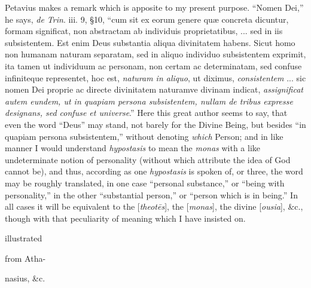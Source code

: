 Petavius makes a remark which is apposite
to my present purpose. ``Nomen Dei,'' he says, \emph{de Trin}.
iii. 9, §10, ``cum sit ex eorum genere quæ concreta dicuntur,
formam significat, non abstractam ab individuis proprietatibus,
... sed in iis subsistentem. Est enim Deus substantia aliqua
divinitatem habens. Sicut homo non humanam naturam separatam,
sed in aliquo individuo subsistentem exprimit, ita tamen ut
individuum ac personam, non certam ac determinatam, sed
confuse infiniteque representet, hoc est, \emph{naturam in aliquo},
ut diximus, \emph{consistentem} ... sic nomen Dei proprie ac
directe divinitatem naturamve divinam indicat, \emph{assignificat
autem eundem, ut in quapiam persona subsistentem, nullam de
tribus expresse designans, sed confuse et universe}.'' Here
this great author seems to say, that even the word ``Deus'' may
stand, not barely for the Divine Being, but besides ``in
quapiam persona subsistentem,'' without denoting \emph{which}
Person; and in like manner I would understand \emph{hypostasis}
to mean the \emph{monas} with a like undeterminate notion of
personality (without which attribute the idea of God cannot
be), and thus, according as one \emph{hypostasis} is spoken
of, or three, the word may be roughly translated, in one case ``personal
substance,'' or ``being with personality,'' in the other ``substantial
person,'' or ``person which is in being.'' In all cases it will
be equivalent to the [\emph{theot\={e}s}], the [\emph{monas}],
the divine [\emph{ousia}], \&c., though with that
peculiarity of meaning which I have insisted on.

illustrated

from Atha-

nasius, \&c.

